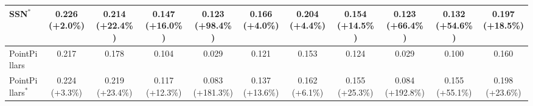 \begin{table}[htpb]
\begin{tabular}{lcccccccccc}
    SSN$^*$ & 0.226 (+2.0\%) & 0.214 (+22.4\%) & 0.147 (+16.0\%) & 0.123 (+98.4\%) & 0.166 (+4.0\%) & 0.204 (+4.4\%) & 0.154 (+14.5\%) & 0.123 (+66.4\%) & 0.132 (+54.6\%) & 0.197 (+18.5\%) \\
    \midrule
    PointPillars & 0.217 & 0.178 & 0.104 & 0.029 & 0.121 & 0.153 & 0.124 & 0.029 & 0.100 & 0.160 \\
    PointPillars$^*$ & 0.224 (+3.3\%) & 0.219 (+23.4\%) & 0.117 (+12.3\%) & 0.083 (+181.3\%) & 0.137 (+13.6\%) & 0.162 (+6.1\%) & 0.155 (+25.3\%) & 0.084 (+192.8\%) & 0.155 (+55.1\%) & 0.198 (+23.6\%) \\
    \bottomrule
    \end{tabular}
    \label{tab:ap_results_4.0}
\end{table}
